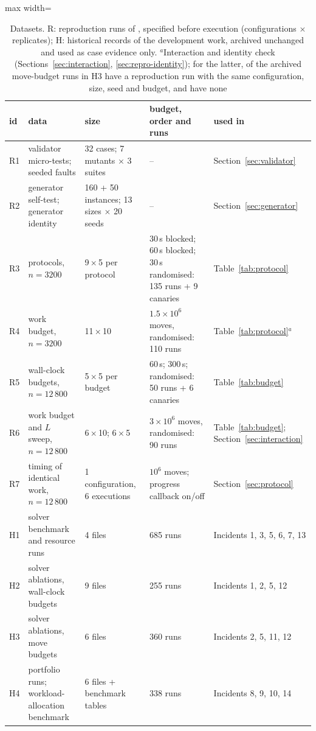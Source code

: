 \begin{table}[t]
\centering
\caption{Datasets. R: reproduction runs of \rpDate, specified before execution (configurations $\times$ replicates);
H: historical records of the development work, archived unchanged and used as case evidence only.
$^{a}$Interaction and identity check (Sections~\ref{sec:interaction}, \ref{sec:repro-identity}); for the latter,
\rpIdentCompared{} of the \rpIdentCandidates{} archived move-budget runs in H3 have a reproduction run with the same configuration,
size, seed and budget, and \rpIdentUnmatched{} have none}
\label{tab:design}
\footnotesize
\begin{adjustbox}{max width=\textwidth}
\begin{tabular}{@{}l p{44mm} p{40mm} p{52mm} l@{}}
\toprule
id & data & size & budget, order and runs & used in \\
\midrule
R1 & validator micro-tests; seeded faults & 32 cases; 7 mutants $\times$ 3 suites & -- & Section~\ref{sec:validator} \\
R2 & generator self-test; generator identity & 160 + 50 instances; 13 sizes $\times$ 20 seeds & -- & Section~\ref{sec:generator} \\
R3 & protocols, $n=3200$ & 9\,$\times$\,5 per protocol & 30\,s blocked; 60\,s blocked; 30\,s randomised: 135 runs + 9 canaries & Table~\ref{tab:protocol} \\
R4 & work budget, $n=3200$ & 11\,$\times$\,10 & $1.5\times10^6$ moves, randomised: 110 runs & Table~\ref{tab:protocol}$^{a}$ \\
R5 & wall-clock budgets, $n=12\,800$ & 5\,$\times$\,5 per budget & 60\,s; 300\,s; randomised: 50 runs + 6 canaries & Table~\ref{tab:budget} \\
R6 & work budget and $L$ sweep, $n=12\,800$ & 6\,$\times$\,10; 6\,$\times$\,5 & $3\times10^6$ moves, randomised: 90 runs & Table~\ref{tab:budget}; Section~\ref{sec:interaction} \\
R7 & timing of identical work, $n=12\,800$ & 1 configuration, 6 executions & $10^6$ moves; progress callback on/off & Section~\ref{sec:protocol} \\
\midrule
H1 & solver benchmark and resource runs & 4 files & 685 runs & Incidents 1, 3, 5, 6, 7, 13 \\
H2 & solver ablations, wall-clock budgets & 9 files & 255 runs & Incidents 1, 2, 5, 12 \\
H3 & solver ablations, move budgets & 6 files & 360 runs & Incidents 2, 5, 11, 12 \\
H4 & portfolio runs; workload-allocation benchmark & 6 files + benchmark tables & 338 runs & Incidents 8, 9, 10, 14 \\
\bottomrule
\end{tabular}
\end{adjustbox}
\end{table}
